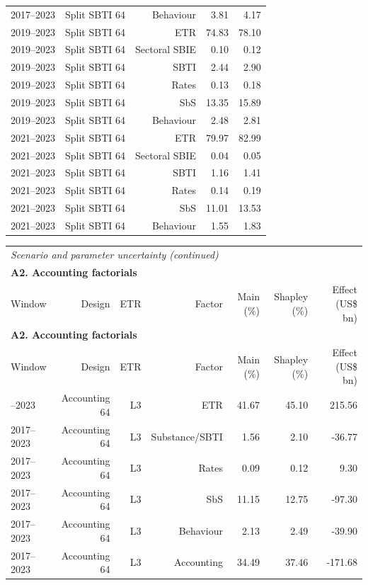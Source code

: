 {\begin{longtable}{@{}lrrrr@{}}
2017–2023 & Split SBTI 64 & Behaviour &  3.81 &  4.17 \\
2019–2023 & Split SBTI 64 & ETR & 74.83 & 78.10 \\
2019–2023 & Split SBTI 64 & Sectoral SBIE &  0.10 &  0.12 \\
2019–2023 & Split SBTI 64 & SBTI &  2.44 &  2.90 \\
2019–2023 & Split SBTI 64 & Rates &  0.13 &  0.18 \\
2019–2023 & Split SBTI 64 & SbS & 13.35 & 15.89 \\
2019–2023 & Split SBTI 64 & Behaviour &  2.48 &  2.81 \\
2021–2023 & Split SBTI 64 & ETR & 79.97 & 82.99 \\
2021–2023 & Split SBTI 64 & Sectoral SBIE &  0.04 &  0.05 \\
2021–2023 & Split SBTI 64 & SBTI &  1.16 &  1.41 \\
2021–2023 & Split SBTI 64 & Rates &  0.14 &  0.19 \\
2021–2023 & Split SBTI 64 & SbS & 11.01 & 13.53 \\
2021–2023 & Split SBTI 64 & Behaviour &  1.55 &  1.83 \\
\end{longtable}
\addtocounter{table}{-1}
\begin{longtable}{@{}lrrrrrr@{}}
\multicolumn{7}{l}{\textit{Scenario and parameter uncertainty (continued)}} \\
\multicolumn{7}{l}{\textbf{A2. Accounting factorials}} \\
\toprule
Window & Design & ETR & Factor & Main (\%) & Shapley (\%) & Effect (US\$ bn) \\
\midrule
\endfirsthead
\multicolumn{7}{l}{\textbf{A2. Accounting factorials}} \\
\toprule
Window & Design & ETR & Factor & Main (\%) & Shapley (\%) & Effect (US\$ bn) \\
\midrule
\endhead
\midrule
\endfoot
\bottomrule
\endlastfoot
2017–2023 & Accounting 64 & L3 & ETR & 41.67 & 45.10 &  215.56 \\
2017–2023 & Accounting 64 & L3 & Substance/SBTI &  1.56 &  2.10 &  -36.77 \\
2017–2023 & Accounting 64 & L3 & Rates &  0.09 &  0.12 &    9.30 \\
2017–2023 & Accounting 64 & L3 & SbS & 11.15 & 12.75 &  -97.30 \\
2017–2023 & Accounting 64 & L3 & Behaviour &  2.13 &  2.49 &  -39.90 \\
2017–2023 & Accounting 64 & L3 & Accounting & 34.49 & 37.46 & -171.68 \\

\end{longtable}}
